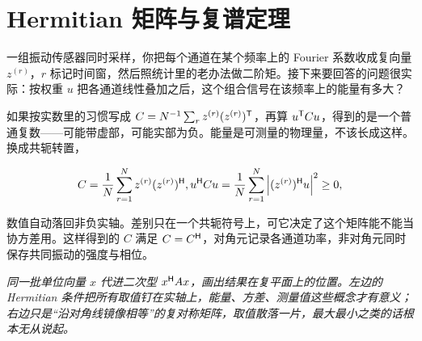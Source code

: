 \section{Hermitian 矩阵与复谱定理}
\label{sec:03-Linear-Algebra/08-Complex-Matrices-and-Fourier-Structure/02}

一组振动传感器同时采样，你把每个通道在某个频率上的 Fourier 系数收成复向量 \(z^{(r)}\)，\(r\) 标记时间窗，然后照统计里的老办法做二阶矩。接下来要回答的问题很实际：按权重 \(u\) 把各通道线性叠加之后，这个组合信号在该频率上的能量有多大？

如果按实数里的习惯写成 \(C=N^{-1}\sum_r z^{(r)}(z^{(r)})^{\mathsf{T}}\)，再算 \(u^{\mathsf{T}}Cu\)，得到的是一个普通复数——可能带虚部，可能实部为负。能量是可测量的物理量，不该长成这样。换成共轭转置，

\[
C=\frac1N\sum_{r=1}^N z^{(r)}(z^{(r)})^{\mathsf{H}},
\space
u^{\mathsf{H}}Cu=\frac1N\sum_{r=1}^N\left|(z^{(r)})^{\mathsf{H}}u\right|^2\ge0,
\]

数值自动落回非负实轴。差别只在一个共轭符号上，可它决定了这个矩阵能不能当协方差用。这样得到的 \(C\) 满足 \(C=C^{\mathsf{H}}\)，对角元记录各通道功率，非对角元同时保存共同振动的强度与相位。

\begin{center}

\emph{同一批单位向量 \(x\) 代进二次型 \(x^{\mathsf{H}}Ax\)，画出结果在复平面上的位置。左边的 Hermitian 条件把所有取值钉在实轴上，能量、方差、测量值这些概念才有意义；右边只是``沿对角线镜像相等''的复对称矩阵，取值散落一片，最大最小之类的话根本无从说起。}
\end{center}

